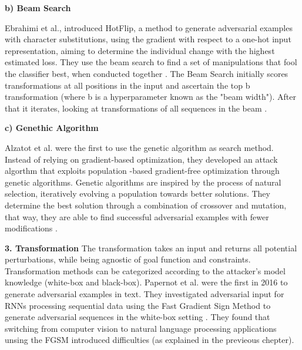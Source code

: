        
    \textbf{b) Beam Search}
    
        Ebrahimi et al., introduced HotFlip, a method to generate adversarial examples with character substitutions, using the gradient with respect to a one-hot input representation, aiming to determine the individual change with the highest estimated loss. They use the beam search to find a set of manipulations that fool the classifier best, when conducted together \cite{ebrahimi2017hotflip}. The Beam Search initially scores transformations at all positions in the input and ascertain the top b transformation (where b is a hyperparameter known as the "beam width"). After that it iterates, looking at transformations of all sequences in the beam \cite{tillmann2003word}. 
        
    \textbf{c) Genethic Algorithm}
    
        Alzatot et al. were the first to use the genetic algorithm as search method. Instead of relying on gradient-based optimization, they developed an attack algorthm that exploits population -based gradient-free optimization through genetic algorithms. Genetic algorithms are inspired by the process of natural selection, iteratively evolving a population towards better solutions. They determine the best solution through a combination of crossover and mutation, that way, they are able to find successful adversarial examples with fewer modifications \cite{alzantot2018generating}.

    \textbf{3. Transformation}
        The transformation takes an input and returns all potential perturbations, while being agnostic of goal function and constraints. Transformation methods can be categorized according to the attacker's model knowledge (white-box and black-box). Papernot et al. were the first in 2016 to generate adversarial examples in text. They investigated adversarial input for RNNs processing sequential data using the Fast Gradient Sign Method to generate adversarial sequences  in the white-box setting \cite{papernot2016crafting}. They found that switching from computer vision to natural language processing applications unsing the FGSM introduced difficulties (as explained in the previeous chepter). 


